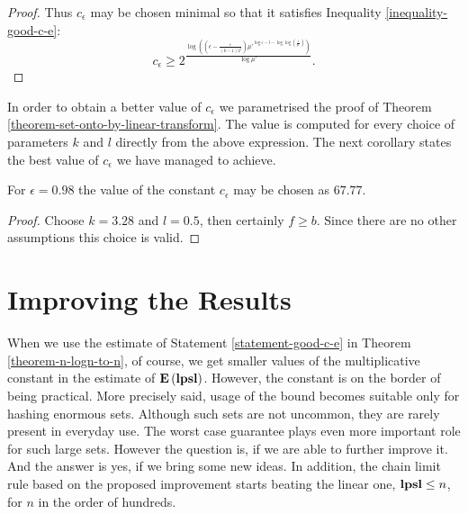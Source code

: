 \begin{proof}
Thus $c_\epsilon$ may be chosen minimal so that it satisfies Inequality \ref{inequality-good-c-e}:
\[
c_\epsilon \geq 2 ^ {\frac{\log \left( \left( \epsilon - \frac{\epsilon}{(k - 1) 2 ^ l}\right) {\mu'}^{\log \epsilon - l - \log \log \left(\frac{1}{\mu'}\right)}\right)}{\log \mu'}} \text{.}
\]
\end{proof}

In order to obtain a better value of $c_\epsilon$ we parametrised the proof of Theorem \ref{theorem-set-onto-by-linear-transform}. The value is computed for every choice of parameters $k$ and $l$ directly from the above expression. The next corollary states the best value of $c_\epsilon$ we have managed to achieve.

\begin{corollary}
For $\epsilon = 0.98$ the value of the constant $c_\epsilon$ may be chosen as $67.77$.
\end{corollary}
\begin{proof}
Choose $k = 3.28$ and $l = 0.5$, then certainly $f \geq b$. Since there are no other assumptions this choice is valid.
\end{proof}

\section{Improving the Results}
When we use the estimate of Statement \ref{statement-good-c-e} in Theorem \ref{theorem-n-logn-to-n}, of course, we get smaller values of the multiplicative constant in the estimate of $\mathbf{E}\left(\mathbf{lpsl}\right)$. However, the constant is on the border of being practical. More precisely said, usage of the bound becomes suitable only for hashing enormous sets. Although such sets are not uncommon, they are rarely present in everyday use. The worst case guarantee plays even more important role for such large sets. However the question is, if we are able to further improve it. And the answer is yes, if we bring some new ideas. In addition, the chain limit rule based on the proposed improvement starts beating the linear one, $\mathbf{lpsl} \leq n$, for $n$ in the order of hundreds.

